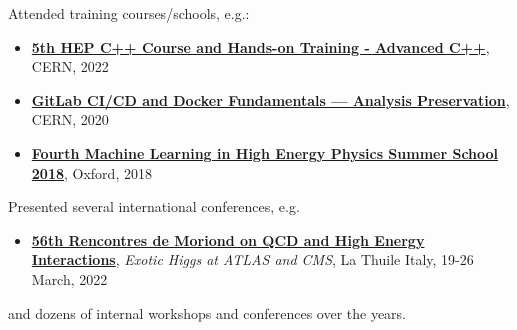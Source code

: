 \documentclass[11 pt,oneside,a4paper,titlepage]{article}
\begin{document}
    \footnotesize Attended training courses/schools, e.g.: 
    \begin{itemize}
        \footnotesize
         \item{\href{https://indico.cern.ch/event/1172498/timetable/?view=standard}{\textbf{5th HEP C++ Course and Hands-on Training - Advanced C++}}, CERN, 2022}%
         \item{\href{https://indico.cern.ch/event/854880/timetable/?view=standard}{\textbf{GitLab CI/CD and Docker Fundamentals --- Analysis Preservation}}, CERN, 2020}%
         \item{\href{https://indico.cern.ch/event/687473/timetable/?view=standard}{\textbf{Fourth Machine Learning in High Energy Physics Summer School 2018}}, Oxford, 2018}%
    \end{itemize}
    Presented several international conferences, e.g.
    \begin{itemize}
    \item \href{https://moriond.in2p3.fr/2022/QCD/Program.html}{\textbf{56th Rencontres de Moriond on QCD and High Energy Interactions}}, \emph{Exotic Higgs at ATLAS and CMS}, La Thuile Italy, 19-26 March, 2022 
    \end{itemize}
     and dozens of internal workshops and conferences over the years.\\
\end{document}
